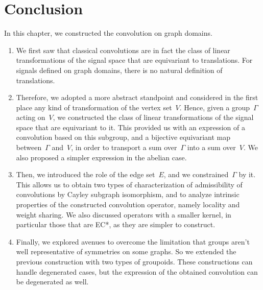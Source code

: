 \section{Conclusion}
\label{sec:2.5}

In this chapter, we constructed the convolution on graph domains.

\begin{enumerate}
\item We first saw that classical convolutions are in fact the class of linear transformations of the signal space that are equivariant to translations. For signals defined on graph domains, there is no natural definition of translations.
\item Therefore, we adopted a more abstract standpoint and considered in the first place any kind of transformation of the vertex set~$V$. Hence, given a group~$\Gamma$ acting on~$V$, we constructed the class of linear transformations of the signal space that are equivariant to it. This provided us with an expression of a convolution based on this subgroup, and a bijective equivariant map between~$\Gamma$ and~$V$, in order to transport a sum over~$\Gamma$ into a sum over~$V$. We also proposed a simpler expression in the abelian case.
\item Then, we introduced the role of the edge set~$E$, and we constrained~$\Gamma$ by it. This allows us to obtain two types of characterization of admissibility of convolutions by Cayley subgraph isomorphism, and to analyze intrinsic properties of the constructed convolution operator, namely locality and weight sharing. We also discussed operators with a smaller kernel, in particular those that are EC*, as they are simpler to construct.
\item Finally, we explored avenues to overcome the limitation that groups aren't well representative of symmetries on some graphs. So we extended the previous construction with two types of groupoids. These constructions can handle degenerated cases, but the expression of the obtained convolution can be degenerated as well.
\end{enumerate}


